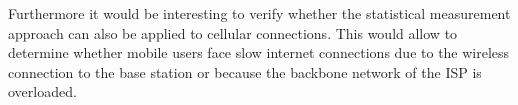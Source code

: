 \documentclass{sig-alternate-10pt}
\begin{document}
Furthermore it would be interesting to verify whether the statistical measurement approach can also be applied to cellular connections. This would allow to determine whether mobile users face slow internet connections due to the wireless connection to the base station or because the backbone network of the ISP is overloaded. 





\end{document}
